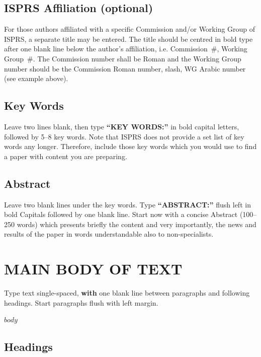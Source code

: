 \documentclass{isprs} %
\begin{document}
\subsection{ISPRS Affiliation (optional)}\label{sec:ISPRS Affiliation (optional)}

For those authors affiliated with a specific Commission and/or Working Group of ISPRS, a separate title may be entered. The title should be centred in bold type after one blank line below the author’s affiliation, i.e. Commission~\#, Working Group~\#. The Commission number shall be Roman and the Working Group number should be the Commission Roman number, slash, WG Arabic number (see example above).


\subsection{Key Words}\label{sec:Key Words}

Leave two lines blank, then type \textbf{``KEY WORDS:''}
in bold capital letters, followed by 5--8 key words. Note that ISPRS does not provide a set 
list of key words any longer. Therefore, include those key words which you would 
use to find a paper with content you are preparing.


\subsection{Abstract}\label{sec:Abstract}

Leave two blank lines under the key words. Type \textbf{``ABSTRACT:''}
flush left in bold Capitals followed by one blank line. Start now
with a concise Abstract (100--250 words) which presents briefly the
content and very importantly, the news and results of the paper in
words understandable also to non-specialists. 


\section{MAIN BODY OF TEXT}\label{sec:MAIN BODY OF TEXT}

Type text single-spaced, \textbf{with} one blank line between paragraphs and 
following headings. Start paragraphs flush with left margin.

$body$

\subsection{Headings}\label{sec:Headings}
\end{document}
